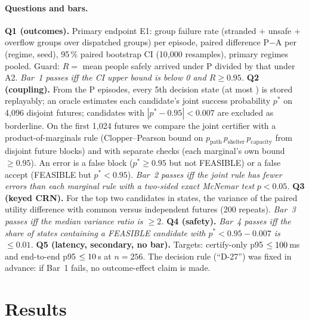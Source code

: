 \documentclass[letterpaper]{article}
\begin{document}
\paragraph{Questions and bars.}
\textbf{Q1 (outcomes).} Primary endpoint E1: group failure rate (stranded + unsafe + overflow groups over
dispatched groups) per episode, paired difference P$-$A per (regime, seed), 95\,\% paired bootstrap CI
(10{,}000 resamples), primary regimes pooled. Guard: $R=$ mean people safely arrived under P divided by
that under A2. \emph{Bar~1 passes iff the CI upper bound is below 0 and $R\ge0.95$.}
\textbf{Q2 (coupling).} From the P episodes, every 5th decision state (at most \nQfourStates) is stored
replayably; an oracle estimates each candidate's joint success probability $p^*$ on 4{,}096 disjoint
futures; candidates with $|p^*-0.95|<0.007$ are excluded as borderline. On the first 1{,}024 futures
we compare the joint certifier with a product-of-marginals rule (Clopper--Pearson bound on
$p_{\text{path}}\,p_{\text{shelter}}\,p_{\text{capacity}}$ from disjoint future blocks) and with separate
checks (each marginal's own bound $\ge0.95$). An error is a false block ($p^*\ge0.95$ but not FEASIBLE) or
a false accept (FEASIBLE but $p^*<0.95$). \emph{Bar~2 passes iff the joint rule has fewer errors than
each marginal rule with a two-sided exact McNemar test} \citep{mcnemar1947} \emph{$p<0.05$.}
\textbf{Q3 (keyed CRN).} For the top two candidates in \nQthreeStates{} states, the variance of the
paired utility difference with common versus independent futures (200 repeats). \emph{Bar~3 passes iff
the median variance ratio is $\ge2$.}
\textbf{Q4 (safety).} \emph{Bar~4 passes iff the share of states containing a FEASIBLE candidate with
$p^*<0.95-0.007$ is $\le0.01$.}
\textbf{Q5 (latency, secondary, no bar).} Targets: certify-only p95 $\le100$\,ms and
end-to-end p95 $\le10$\,s at $n=256$.
The decision rule (``D-27'') was fixed in advance: if Bar~1 fails, no outcome-effect claim is made.

\section{Results}

\begin{table}[t]
\centering\small

\caption{Pre-registered bars. Bars 2 and 4 pass; Bars 1 and 3 fail. E1 is P$-$A in group failure rate
(\nEOnePairs{} paired episodes); $R$ is people safely arrived under P relative to A2.}
\label{tab:bars}
\end{table}
\end{document}
